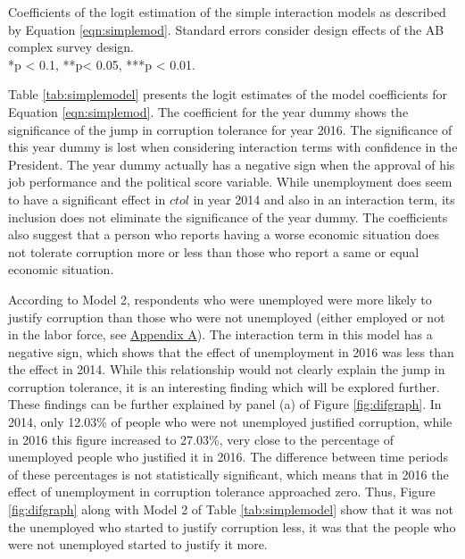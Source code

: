 \documentclass[floatsintext,man]{apa7}\usepackage[]{graphicx}\usepackage[]{color}
\begin{document}
\begin{table}[htbp]
\begin{center}
\end{center}
Coefficients of the logit estimation of the simple interaction models as described by Equation \ref{eqn:simplemod}. Standard errors consider design effects of the AB complex survey design. \\ 
*p < 0.1, **p< 0.05, ***p < 0.01.
\end{table}

Table \ref{tab:simplemodel} presents the logit estimates of the model coefficients for Equation \ref{eqn:simplemod}. The coefficient for the year dummy shows the significance of the jump in corruption tolerance for year 2016. The significance of this year dummy is lost when considering interaction terms with confidence in the President. The year dummy actually has a negative sign when the approval of his job performance and the political score variable. While unemployment does seem to have a significant effect in $ctol$ in year 2014 and also in an interaction term, its inclusion does not eliminate the significance of the year dummy. The coefficients also suggest that a person who reports having a worse economic situation does not tolerate corruption more or less than those who report a same or equal economic situation. 

According to Model 2, respondents who were unemployed were more likely to justify corruption than those who were not unemployed (either employed or not in the labor force, see \hyperref[app:first]{Appendix A}). The interaction term in this model has a negative sign, which shows that the effect of unemployment in 2016 was less than the effect in 2014. While this relationship would not clearly explain the jump in corruption tolerance, it is an interesting finding which will be explored further. These findings can be further explained by panel (a) of Figure \ref{fig:difgraph}. In 2014, only 12.03\% of people who were not unemployed justified corruption, while in 2016 this figure increased to 27.03\%, very close to the percentage of unemployed people who justified it in 2016. The difference between time periods of these percentages is not statistically significant, which means that in 2016 the effect of unemployment in corruption tolerance approached zero. Thus, Figure \ref{fig:difgraph} along with Model 2 of Table \ref{tab:simplemodel} show that it was not the unemployed who started to justify corruption less, it was that the people who were not unemployed started to justify it more. 
\end{document}
